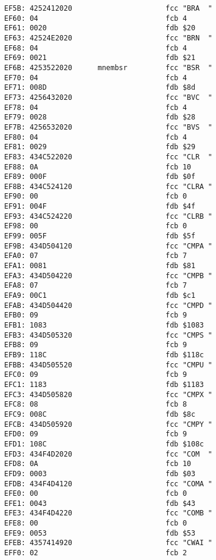 {\begin{verbatim}
EF5B: 4252412020                      fcc "BRA  "
EF60: 04                              fcb 4
EF61: 0020                            fdb $20 
EF63: 42524E2020                      fcc "BRN  "
EF68: 04                              fcb 4
EF69: 0021                            fdb $21
EF6B: 4253522020      mnembsr         fcc "BSR  "
EF70: 04                              fcb 4
EF71: 008D                            fdb $8d
EF73: 4256432020                      fcc "BVC  "
EF78: 04                              fcb 4
EF79: 0028                            fdb $28
EF7B: 4256532020                      fcc "BVS  "
EF80: 04                              fcb 4
EF81: 0029                            fdb $29
EF83: 434C522020                      fcc "CLR  "
EF88: 0A                              fcb 10
EF89: 000F                            fdb $0f
EF8B: 434C524120                      fcc "CLRA "
EF90: 00                              fcb 0
EF91: 004F                            fdb $4f
EF93: 434C524220                      fcc "CLRB "
EF98: 00                              fcb 0
EF99: 005F                            fdb $5f
EF9B: 434D504120                      fcc "CMPA "
EFA0: 07                              fcb 7
EFA1: 0081                            fdb $81
EFA3: 434D504220                      fcc "CMPB "
EFA8: 07                              fcb 7
EFA9: 00C1                            fdb $c1
EFAB: 434D504420                      fcc "CMPD "
EFB0: 09                              fcb 9
EFB1: 1083                            fdb $1083
EFB3: 434D505320                      fcc "CMPS "
EFB8: 09                              fcb 9
EFB9: 118C                            fdb $118c
EFBB: 434D505520                      fcc "CMPU "
EFC0: 09                              fcb 9
EFC1: 1183                            fdb $1183
EFC3: 434D505820                      fcc "CMPX "
EFC8: 08                              fcb 8
EFC9: 008C                            fdb $8c
EFCB: 434D505920                      fcc "CMPY "
EFD0: 09                              fcb 9
EFD1: 108C                            fdb $108c
EFD3: 434F4D2020                      fcc "COM  "
EFD8: 0A                              fcb 10
EFD9: 0003                            fdb $03
EFDB: 434F4D4120                      fcc "COMA "
EFE0: 00                              fcb 0
EFE1: 0043                            fdb $43
EFE3: 434F4D4220                      fcc "COMB "
EFE8: 00                              fcb 0
EFE9: 0053                            fdb $53
EFEB: 4357414920                      fcc "CWAI "
EFF0: 02                              fcb 2

\end{verbatim}}
